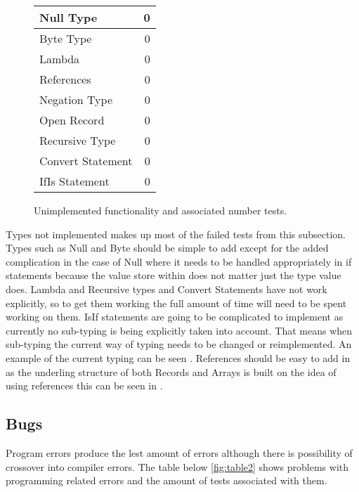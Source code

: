 \begin{figure}[H]
  \centering
  \begin{tabular}{| l || r |}
  \hline
  Null Type & 0 \\ \hline
  Byte Type & 0 \\ \hline
  Lambda & 0 \\ \hline
  References & 0 \\ \hline
  Negation Type & 0 \\ \hline
  Open Record & 0 \\ \hline
  Recursive Type & 0 \\ \hline
  Convert Statement& 0 \\ \hline
  IfIs Statement & 0 \\ 
  \hline
  \end{tabular}
  \caption{Unimplemented functionality and associated number tests.}
  \label{fig:table1}
\end{figure}

Types not implemented makes up most of the failed tests from this subsection. Types such as Null and Byte should be simple to add except for the added complication in the case of Null where it needs to be handled appropriately in if statements because the value store within does not matter just the type value does. %
Lambda and Recursive types and Convert Statements have not work explicitly, so to get them working the full amount of time will need to be spent working on them. IsIf statements are going to be complicated to implement as currently no sub-typing is being explicitly taken into account. That means when sub-typing the current way of typing needs to be changed or reimplemented. An example of the current typing can be seen %
. 
References should be easy to add in as the underling structure of both Records and Arrays is built on the idea of using references this can be seen in %
. %

\subsection{Bugs}


Program errors produce the lest amount of errors although there is possibility of crossover into compiler errors. The table below \ref{fig:table2} shows problems with programming related errors and the amount of tests associated with them.

